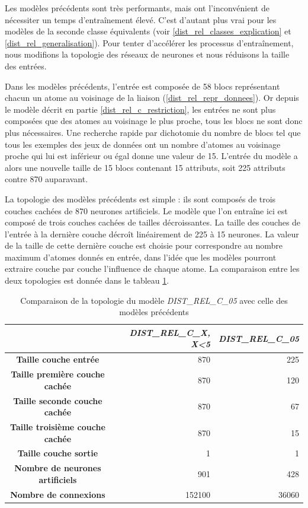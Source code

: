 \label{dist_rel_c_reduc_largeur}
\par Les modèles précédents sont très performants, mais ont l'inconvénient de nécessiter un temps d'entraînement élevé. C'est d'autant plus vrai pour les modèles de la seconde classe équivalents (voir \ref{dist_rel_classes_explication} et \ref{dist_rel_generalisation}). Pour tenter d'accélérer les processus d'entraînement, nous modifions la topologie des réseaux de neurones et nous réduisons la taille des entrées.
\par Dans les modèles précédents, l'entrée est composée de 58 blocs représentant chacun un atome au voisinage de la liaison (\ref{dist_rel_repr_donnees}). Or depuis le modèle décrit en partie \ref{dist_rel_c_restriction}, les entrées ne sont plus composées que des atomes au voisinage le plus proche, tous les blocs ne sont donc plus nécessaires. Une recherche rapide par dichotomie du nombre de blocs tel que tous les exemples des jeux de données ont un nombre d'atomes au voisinage proche qui lui est inférieur ou égal donne une valeur de 15. L'entrée du modèle a alors une nouvelle taille de 15 blocs contenant 15 attributs, soit 225 attributs contre 870 auparavant.
\par La topologie des modèles précédents est simple : ils sont composés de trois couches cachées de 870 neurones artificiels. Le modèle que l'on entraîne ici est composé de trois couches cachées de tailles décroissantes. La taille des couches de l'entrée à la dernière couche décroît linéairement de 225 à 15 neurones. La valeur de la taille de cette dernière couche est choisie pour correspondre au nombre maximum d'atomes donnés en entrée, dans l'idée que les modèles pourront extraire couche par couche l'influence de chaque atome. La comparaison entre les deux topologies est donnée dans le tableau \ref{tparams_dist_rel_c_05}.

\begin{table}
	\centering
	\begin{tabular}{|c|r|r|}
		\hline
		& \textbf{\emph{DIST\_REL\_C\_X, X<5}} & \textbf{\emph{DIST\_REL\_C\_05}}\\ \hline
		\textbf{Taille couche entrée} & 870 & 225 \\ \hline
		\textbf{Taille première couche cachée} & 870 & 120\\ \hline
		\textbf{Taille seconde couche cachée} & 870 & 67\\ \hline
		\textbf{Taille troisième couche cachée} & 870 & 15\\ \hline
		\textbf{Taille couche sortie} & 1 & 1\\ \hline
		\textbf{Nombre de neurones artificiels} & 901 & 428\\ \hline
		\textbf{Nombre de connexions} & 152100 & 36060 \\ \hline
	\end{tabular}
	
	\caption{Comparaison de la topologie du modèle \emph{DIST\_REL\_C\_05} avec celle des modèles précédents}
	\label{tparams_dist_rel_c_05}
\end{table}

